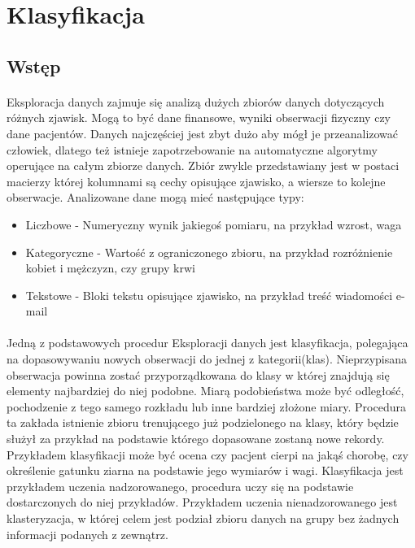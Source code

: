 \documentclass[a4paper,12pt,twoside]{article}
\begin{document}
\newpage
\section{Klasyfikacja}
\subsection{Wstęp}
\paragraph{}
Eksploracja danych zajmuje się analizą dużych zbiorów danych dotyczących różnych zjawisk. Mogą to być dane finansowe, wyniki obserwacji fizyczny czy dane pacjentów. Danych najczęściej jest zbyt dużo aby mógł je przeanalizować człowiek, dlatego też istnieje zapotrzebowanie na automatyczne algorytmy operujące na całym zbiorze danych. Zbiór zwykle przedstawiany jest w postaci macierzy której kolumnami są cechy opisujące zjawisko, a wiersze to kolejne obserwacje. Analizowane dane mogą mieć następujące typy:
\begin{itemize}
    \item Liczbowe - Numeryczny wynik jakiegoś pomiaru, na przykład wzrost, waga
    \item Kategoryczne - Wartość z ograniczonego zbioru, na przykład rozróżnienie kobiet i mężczyzn, czy grupy krwi
    \item Tekstowe - Bloki tekstu opisujące zjawisko, na przykład treść wiadomości e-mail 
\end{itemize}
\paragraph{}
Jedną z podstawowych procedur Eksploracji danych jest klasyfikacja, polegająca na dopasowywaniu nowych obserwacji do jednej z kategorii(klas). Nieprzypisana obserwacja powinna zostać przyporządkowana do klasy w której znajdują się  elementy najbardziej do niej podobne. Miarą podobieństwa może być odległość, pochodzenie z tego samego rozkładu lub inne bardziej złożone miary. Procedura ta zakłada istnienie zbioru trenującego już podzielonego na klasy, który będzie służył za przykład na podstawie którego dopasowane zostaną nowe rekordy.  Przykładem klasyfikacji może być  ocena czy pacjent cierpi na jakąś chorobę, czy określenie gatunku ziarna na podstawie jego wymiarów i wagi.  Klasyfikacja jest przykładem uczenia nadzorowanego, procedura uczy się na podstawie dostarczonych do niej przykładów. Przykładem uczenia nienadzorowanego jest klasteryzacja, w której celem jest podział zbioru danych na grupy bez żadnych informacji podanych z zewnątrz.
\newpage
\end{document}
